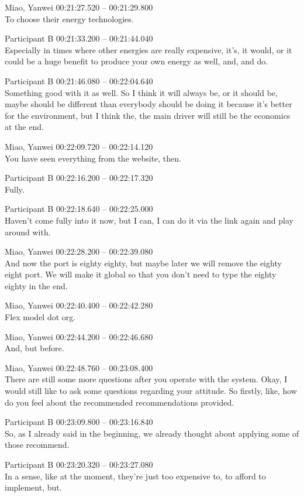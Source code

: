 {Miao, Yanwei 00:21:27.520 -- 00:21:29.800 \\
To choose their energy technologies.

Participant B 00:21:33.200 -- 00:21:44.040 \\
Especially in times where other energies are really expensive, it's, it would, or it could be a huge benefit to produce your own energy as well, and, and do.

Participant B 00:21:46.080 -- 00:22:04.640 \\
Something good with it as well. So I think it will always be, or it should be, maybe should be different than everybody should be doing it because it's better for the environment, but I think the, the main driver will still be the economics at the end.

Miao, Yanwei 00:22:09.720 -- 00:22:14.120 \\
You have seen everything from the website, then.

Participant B 00:22:16.200 -- 00:22:17.320 \\
Fully.

Participant B 00:22:18.640 -- 00:22:25.000 \\
Haven't come fully into it now, but I can, I can do it via the link again and play around with.

Miao, Yanwei 00:22:28.200 -- 00:22:39.080 \\
And now the port is eighty eighty, but maybe later we will remove the eighty eight port. We will make it global so that you don't need to type the eighty eighty in the end.

Miao, Yanwei 00:22:40.400 -- 00:22:42.280 \\
Flex model dot org.

Miao, Yanwei 00:22:44.200 -- 00:22:46.680 \\
And, but before.

Miao, Yanwei 00:22:48.760 -- 00:23:08.400 \\
There are still some more questions after you operate with the system. Okay, I would still like to ask some questions regarding your attitude. So firstly, like, how do you feel about the recommended recommendations provided.

Participant B 00:23:09.800 -- 00:23:16.840 \\
So, as I already said in the beginning, we already thought about applying some of those recommend.

Participant B 00:23:20.320 -- 00:23:27.080 \\
In a sense, like at the moment, they're just too expensive to, to afford to implement, but.

}
